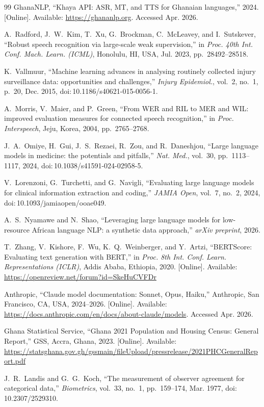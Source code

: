 \documentclass[conference]{IEEEtran}
\begin{document}
\begin{thebibliography}{99}
GhanaNLP,
``Khaya API: ASR, MT, and TTS for Ghanaian languages,''
2024. [Online]. Available: \url{https://ghananlp.org}.
Accessed Apr. 2026.

A.~Radford, J.~W.~Kim, T.~Xu, G.~Brockman, C.~McLeavey, and
I.~Sutskever,
``Robust speech recognition via large-scale weak supervision,''
in \textit{Proc. 40th Int. Conf. Mach. Learn. (ICML)},
Honolulu, HI, USA, Jul. 2023, pp.~28492--28518.

K.~Vallmuur,
``Machine learning advances in analysing routinely collected injury
surveillance data: opportunities and challenges,''
\textit{Injury Epidemiol.}, vol.~2, no.~1, p.~20, Dec. 2015,
doi:\,10.1186/s40621-015-0056-1.

A.~Morris, V.~Maier, and P.~Green,
``From WER and RIL to MER and WIL: improved evaluation measures for
connected speech recognition,''
in \textit{Proc. Interspeech}, Jeju, Korea, 2004, pp.~2765--2768.

J.~A.~Omiye, H.~Gui, J.~S.~Rezaei, R.~Zou, and R.~Daneshjou,
``Large language models in medicine: the potentials and pitfalls,''
\textit{Nat. Med.}, vol.~30, pp.~1113--1117, 2024,
doi:\,10.1038/s41591-024-02958-5.

V.~Lorenzoni, G.~Turchetti, and G.~Navigli,
``Evaluating large language models for clinical information
extraction and coding,''
\textit{JAMIA Open}, vol.~7, no.~2, 2024,
doi:\,10.1093/jamiaopen/ooae049.

A.~S.~Nyamawe and N.~Shao,
``Leveraging large language models for low-resource African language
NLP: a synthetic data approach,''
\textit{arXiv preprint}, 2026.

T.~Zhang, V.~Kishore, F.~Wu, K.~Q.~Weinberger, and Y.~Artzi,
``BERTScore: Evaluating text generation with BERT,''
in \textit{Proc. 8th Int. Conf. Learn. Representations (ICLR)},
Addis Ababa, Ethiopia, 2020.
[Online]. Available:
\url{https://openreview.net/forum?id=SkeHuCVFDr}

Anthropic,
``Claude model documentation: Sonnet, Opus, Haiku,''
Anthropic, San Francisco, CA, USA, 2024--2026.
[Online]. Available: \url{https://docs.anthropic.com/en/docs/about-claude/models}.
Accessed Apr. 2026.

Ghana Statistical Service,
``Ghana 2021 Population and Housing Census: General Report,''
GSS, Accra, Ghana, 2023.
[Online]. Available:
\url{https://statsghana.gov.gh/gssmain/fileUpload/pressrelease/2021PHCGeneralReport.pdf}

J.~R.~Landis and G.~G.~Koch,
``The measurement of observer agreement for categorical data,''
\textit{Biometrics}, vol.~33, no.~1, pp.~159--174, Mar. 1977,
doi:\,10.2307/2529310.

\end{thebibliography}
\end{document}
